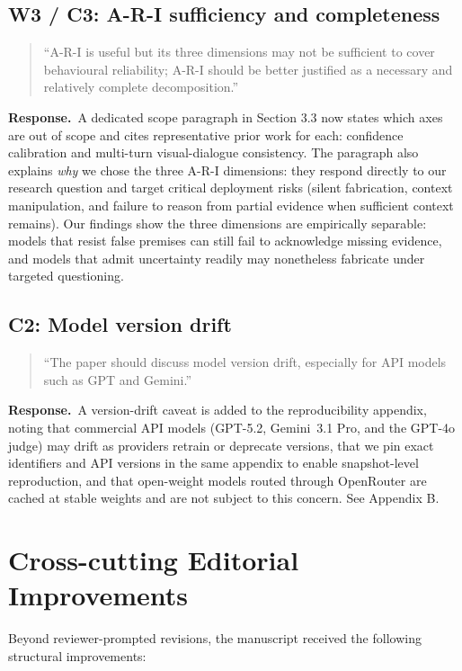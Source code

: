 \documentclass[11pt]{article}
\newcommand{\revsec}[1]{\textcolor{revisiongreen}{#1}}
\newenvironment{reviewercomment}{%
  \begin{quote}\small\itshape
}{%
  \end{quote}
}
\newcommand{\response}{\noindent\textbf{Response.}~}
\newcommand{\revisionitem}[3]{%
  \subsection{#1}
  \begin{reviewercomment}
  ``#2''
  \end{reviewercomment}
  \response #3\par
}
\begin{document}
\revisionitem
{W3 / C3: A-R-I sufficiency and completeness}
{A-R-I is useful but its three dimensions may not be sufficient to cover behavioural reliability; A-R-I should be better justified as a necessary and relatively complete decomposition.}
{A dedicated scope paragraph in \revsec{Section 3.3} now states which axes are out of scope and cites representative prior work for each: confidence calibration and multi-turn visual-dialogue consistency. The paragraph also explains \emph{why} we chose the three A-R-I dimensions: they respond directly to our research question and target critical deployment risks (silent fabrication, context manipulation, and failure to reason from partial evidence when sufficient context remains). Our findings show the three dimensions are empirically separable: models that resist false premises can still fail to acknowledge missing evidence, and models that admit uncertainty readily may nonetheless fabricate under targeted questioning.}

\revisionitem
{C2: Model version drift}
{The paper should discuss model version drift, especially for API models such as GPT and Gemini.}
{A version-drift caveat is added to the reproducibility appendix, noting that commercial API models (GPT-5.2, Gemini~3.1 Pro, and the GPT-4o judge) may drift as providers retrain or deprecate versions, that we pin exact identifiers and API versions in the same appendix to enable snapshot-level reproduction, and that open-weight models routed through OpenRouter are cached at stable weights and are not subject to this concern. See \revsec{Appendix B}.}

\section{Cross-cutting Editorial Improvements}

Beyond reviewer-prompted revisions, the manuscript received the following structural improvements:
\end{document}
